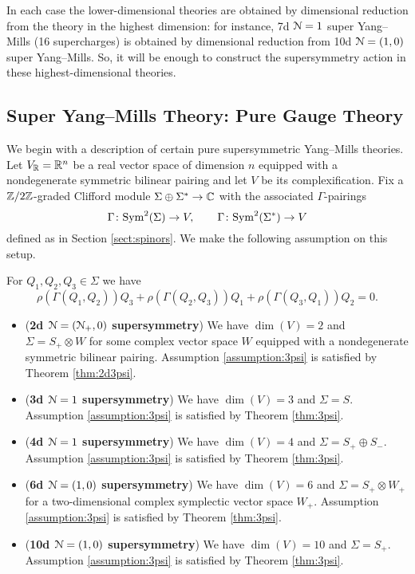 \documentclass[10pt, oneside]{article}
\begin{document}
In each case the lower-dimensional theories are obtained by dimensional reduction from the theory in the highest dimension: for instance, 7d $\mathcal{N}=1$ super Yang--Mills (16 supercharges) is obtained by dimensional reduction from 10d $\mathcal{N}=(1, 0)$ super Yang--Mills. So, it will be enough to construct the supersymmetry action in these highest-dimensional theories.

\subsection{Super Yang--Mills Theory: Pure Gauge Theory}
\label{sect:gaugemultipletSUSY}

We begin with a description of certain pure supersymmetric Yang--Mills theories. Let $V_\mathbb R = \mathbb R^n$ be a real vector space of dimension $n$ equipped with a nondegenerate symmetric bilinear pairing and let $V$ be its complexification. 
Fix a $\mathbb Z/2\mathbb Z$-graded Clifford module $\Sigma\oplus \Sigma^*\rightarrow \mathbb C$ with the associated $\Gamma$-pairings
\[\Gamma\colon {\rm Sym}^2(\Sigma)\rightarrow V,\qquad \Gamma\colon {\rm Sym}^2(\Sigma^*)\rightarrow V\]
defined as in Section \ref{sect:spinors}. We make the following assumption on this setup.

\begin{assumption}
For $Q_1, Q_2, Q_3\in\Sigma$ we have
\[\rho(\Gamma(Q_1, Q_2))Q_3 + \rho(\Gamma(Q_2, Q_3))Q_1 + \rho(\Gamma(Q_3, Q_1))Q_2 = 0.\]
\label{assumption:3psi}
\end{assumption}

\begin{itemize}
\item (\textbf{2d $\mathcal N=(\mathcal N_+, 0)$ supersymmetry}) We have $\dim(V) = 2$ and $\Sigma = S_+\otimes W$ for some complex vector space $W$ equipped with a nondegenerate symmetric bilinear pairing. Assumption \ref{assumption:3psi} is satisfied by Theorem \ref{thm:2d3psi}.

\item (\textbf{3d $\mathcal N=1$ supersymmetry}) We have $\dim(V) = 3$ and $\Sigma = S$. Assumption \ref{assumption:3psi} is satisfied by Theorem \ref{thm:3psi}.

\item (\textbf{4d $\mathcal N=1$ supersymmetry}) We have $\dim(V) = 4$ and $\Sigma = S_+\oplus S_-$. Assumption \ref{assumption:3psi} is satisfied by Theorem \ref{thm:3psi}.

\item (\textbf{6d $\mathcal N=(1, 0)$ supersymmetry}) We have $\dim(V) = 6$ and $\Sigma = S_+\otimes W_+$ for a two-dimensional complex symplectic vector space $W_+$. Assumption \ref{assumption:3psi} is satisfied by Theorem \ref{thm:3psi}.

\item (\textbf{10d $\mathcal N=(1, 0)$ supersymmetry}) We have $\dim(V) = 10$ and $\Sigma = S_+$. Assumption \ref{assumption:3psi} is satisfied by Theorem \ref{thm:3psi}.
\end{itemize}
\end{document}
